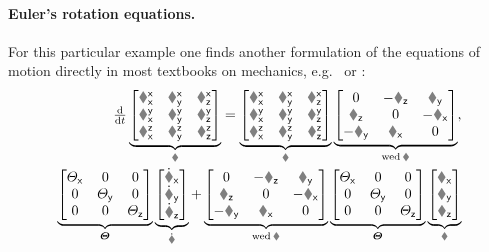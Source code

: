 \paragraph{Euler's rotation equations.}
For this particular example one finds another formulation of the equations of motion directly in most textbooks on mechanics, e.g.\ \cite[p.\,143]{Arnold:MathematicalMethodsOfClassicalMechanics} or \cite[p.\,145]{Schwertassek:MultibodySystems}:
\begin{subequations}\label{eq:ExampleEulerEq}
\begin{align}
 \ddt
 \underbrace{\begin{bmatrix} \Rxx & \Rxy & \Rxz \\ \Ryx & \Ryy & \Ryz \\ \Rzx & \Rzy & \Rzz \end{bmatrix}}_{\R}
 =
 \underbrace{\begin{bmatrix} \Rxx & \Rxy & \Rxz \\ \Ryx & \Ryy & \Ryz \\ \Rzx & \Rzy & \Rzz \end{bmatrix}}_{\R}
 \underbrace{\begin{bmatrix} 0 & -\wz & \wy \\ \wz & 0 & -\wx \\ -\wy & \wx & 0\end{bmatrix}}_{\wedOp{\w}},
\label{eq:ExampleEulerEqKinematics}
\\
 \underbrace{\begin{bmatrix} \Jx & 0 & 0 \\ 0 & \Jy & 0 \\ 0 & 0 & \Jz \end{bmatrix}}_{\J}
 \underbrace{\begin{bmatrix} \wxd \\ \wyd \\ \wzd \end{bmatrix}}_{\dot{\w}}
 + \underbrace{\begin{bmatrix} 0 & -\wz & \wy \\ \wz & 0 & -\wx \\ -\wy & \wx & 0\end{bmatrix}}_{\wedOp{\w}}
 \underbrace{\begin{bmatrix} \Jx & 0 & 0 \\ 0 & \Jy & 0 \\ 0 & 0 & \Jz \end{bmatrix}}_{\J}
 \underbrace{\begin{bmatrix} \wx \\ \wy \\ \wz \end{bmatrix}}_{\w}

\end{align}
\end{subequations}
